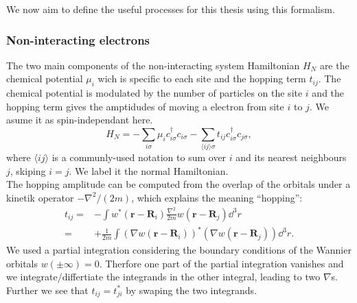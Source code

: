 \documentclass[../main.tex]{subfile}
\begin{document}
We now aim to define the useful processes for this thesis using this formalism.

\subsubsection{Non-interacting electrons}
The two main components of the non-interacting system Hamiltonian $H_N$ are the chemical potential $\mu_i$ wich is specific to each site and the hopping term $t_{ij}$.
The chemical potential is modulated by the number of particles on the site $i$ and the hopping term gives the amptidudes of moving a electron from site $i$ to $j$.
We asume it as spin-independant here.\\
\begin{equation}\label{eq:Ham_Normal}
    H_N = - \sum_{i \sigma} \mu_i c_{i\sigma}^{\dagger} c_{i\sigma} - \sum_{\langle ij\rangle \sigma} t_{ij} c_{i\sigma}^{\dagger} c_{j\sigma},
\end{equation}
where $\langle ij\rangle$ is a communly-used notation to sum over $i$ and its nearest neighbours $j$, skiping $i=j$. We label it the normal
Hamiltonian.\\

The hopping amplitude can be computed from the overlap of the orbitals under a kinetik operator $-\nabla^2/(2m)$, which explains the meaning ``hopping'':
\begin{align*}
    t_{ij} =& -\int w^{\ast}(\bm{r} - \bm{R}_i) \frac{\nabla^2}{2m} w(\bm{r} - \bm{R}_j) \dd^3r\\
           =& +\frac{1}{2m}\int \left(\nabla w(\bm{r} - \bm{R}_i)\right)^{\ast} \left(\nabla w(\bm{r} - \bm{R}_j)\right) \dd^3r.
\end{align*}
We used a partial integration considering the boundary conditions of the Wannier orbitals $w(\pm \infty) = 0$. Therfore one part of the partial integration vanishes
and we integrate/differtiate the integrands in the other integral, leading to two $\nabla$s. Further we see that $t_{ij} = t_{ji}^{\ast}$ by swaping the two integrands.\\
\end{document}
